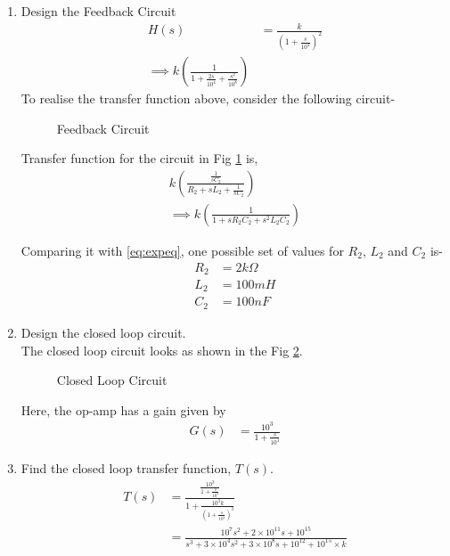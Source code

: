 \begin{enumerate}[label=\arabic*.,ref=\theenumi]
\item Design the Feedback Circuit\\
\solution 
\begin{align}
    H(s)&= \frac{k}{\left(1+\frac{s}{10^4}\right)^2}\\
\label{eq:expeq}
    \implies k\left({\frac{1}{1+\frac{2s}{10^4}+\frac{s^2}{10^8}}}\right)  
\end{align}
To realise the transfer function above, consider the following circuit-

\begin{figure}[!ht]
	\begin{center}
		
		\resizebox{\columnwidth}{!}{}
	\end{center}
\caption{Feedback Circuit}
\label{fig:ee18btech11038_feedb}
\end{figure}

Transfer function for the circuit in Fig \ref{fig:ee18btech11038_feedb} is,
\begin{align}
    k\left(\frac{\frac{1}{s{C_2}}}{{R_2}+s{L_2}+\frac{1}{s{C_2}}}\right)\\
    \implies k\left(\frac{1}{1+s{R_2}{C_2}+{s^2}{L_2}{C_2}}\right)
\end{align}

Comparing it with \ref{eq:expeq}, one possible set of values for $R_{2}$, $L_{2}$ and $C_{2}$ is-
\begin{align}
    R_{2}&= 2k\Omega \\
    L_{2}&= 100mH\\ 
C_{2}&= 100nF
\end{align}

\item Design the closed loop circuit.\\
\solution The closed loop circuit looks as shown in the Fig \ref{fig:ee18btech11038_cla}.

\begin{figure}[!ht]
	\begin{center}
		
		\resizebox{\columnwidth}{!}{}
	\end{center}
\caption{Closed Loop Circuit}
\label{fig:ee18btech11038_cla}
\end{figure}

Here, the op-amp has a gain given by
\begin{align}
    G(s) &= \frac{10^3}{1+\frac{s}{10^4}}
\end{align}
\item Find the closed loop transfer function, $T(s)$.\\
\solution 
\begin{align}
    T(s)&=\frac{\frac{10^3}{1+\frac{s}{10^4}}}{1+\frac{10^3k}{\left(1+\frac{s}{10^4}\right)^3}}\\
    &=\frac{10^7s^2+2\times10^{11}s+10^{15}}{s^3+3\times10^4s^2+3\times10^8s+10^{12} + 10^{15}\times k}
\end{align}


\end{enumerate}
